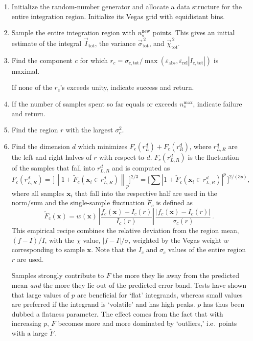\documentclass[12pt]{article}
\newcommand\ie{i.e.\ }
\newcommand\epsabs{\varepsilon_{\text{abs}}}
\newcommand\epsrel{\varepsilon_{\text{rel}}}
\newcommand\nnew{n_s^{\text{new}}}
\newcommand\nmax{n_s^{\text{max}}}
\newcommand\tot{_{\text{tot}}}
\newcommand\ctot{_{c,\text{tot}}}
\newcommand\cvec[1]{\vec #1}
\newcommand\dvec[1]{\mathbf{#1}}
\begin{document}
\begin{enumerate}
\item
Initialize the random-number generator and allocate a data structure for
the entire integration region.  Initialize its Vegas grid with
equidistant bins.

\item
Sample the entire integration region with $\nnew$ points. This gives an
initial estimate of the integral $\cvec I\tot$, the variance 
$\cvec\sigma\tot^{\,2}$, and $\cvec\chi\tot^{\,2}$.

\item
Find the component $c$ for which $r_c = \sigma\ctot/
\max(\epsabs, \epsrel |I\ctot|)$ is maximal.

If none of the $r_c$'s exceeds unity, indicate success and return.

\item
If the number of samples spent so far equals or exceeds $\nmax$,
indicate failure and return.

\item
Find the region $r$ with the largest $\sigma_c^2$.

\item
Find the dimension $d$ which minimizes $F_c(r_L^d) + F_c(r_R^d)$, where
$r_{L,R}^d$ are the left and right halves of $r$ with respect to $d$. 
$F_c(r_{L,R}^d)$ is the fluctuation of the samples that fall into
$r_{L,R}^d$ and is computed as
\begin{equation}
\label{eq:fluct}
F_c(r_{L,R}^d)
= \biggl[\left\|
    1 + \tilde F_c(\dvec x_i\in r_{L,R}^d)
  \right\|_p\biggr]^{2/3}
= \biggl[\sum\left|
    1 + \tilde F_c(\dvec x_i\in r_{L,R}^d)
  \right|^p\,\biggr]^{2/(3p)},
\end{equation}
where all samples $\dvec x_i$ that fall into the respective half are 
used in the norm/sum and the single-sample fluctuation $\tilde F_c$ is 
defined as
$$
\tilde F_c(\dvec x) =
  w(\dvec x) \, \left|\frac{f_c(\dvec x) - I_c(r)}{I_c(r)}\right|
             \, \frac{|f_c(\dvec x) - I_c(r)|}{\sigma_c(r)}\,.
$$
This empirical recipe combines the relative deviation from the region
mean, $(f - I)/I$, with the $\chi$ value, $|f - I|/\sigma$, weighted by 
the Vegas weight $w$ corresponding to sample $\dvec x$.  Note that the 
$I_c$ and $\sigma_c$ values of the entire region $r$ are used.

Samples strongly contribute to $F$ the more they lie away from the
predicted mean \emph{and} the more they lie out of the predicted error
band.  Tests have shown that large values of $p$ are beneficial for
`flat' integrands, whereas small values are preferred if the integrand
is `volatile' and has high peaks.  $p$ has thus been dubbed a flatness
parameter.  The effect comes from the fact that with increasing $p$, $F$
becomes more and more dominated by `outliers,' \ie points with a large 
$\tilde F$.


\end{enumerate}
\end{document}
